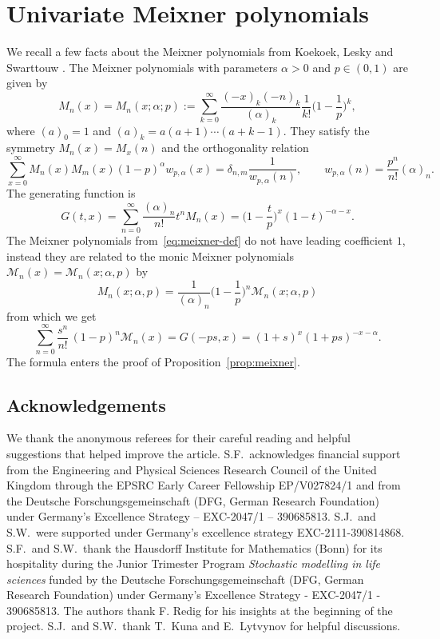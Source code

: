 \documentclass[10pt,a4paper]{amsart}
\numberwithin{equation}{section}
\newcommand{\1}{\mathbbm{1}}
\begin{document}
\section{Univariate Meixner polynomials} \label{app:meixner}
We recall a few facts about the Meixner polynomials from Koekoek, Lesky and Swarttouw \mbox{\cite[Section 9]{HypergeometricOrthogonalPolynomials}}. The Meixner polynomials with parameters $\alpha>0$ and $p\in (0,1)$ are given by
\begin{equation} \label{eq:meixner-def}
 M_n(x) = M_n(x; \alpha; p) := \sum_{k=0}^\infty \frac{(-x)_k (-n)_k}{(\alpha)_k} \frac{1}{k!} \biggl(1- \frac1p\biggr)^k,
\end{equation}
where $(a)_0 = 1$ and $(a)_k = a(a+1)\cdots (a+k-1)$.
They satisfy the symmetry $M_n(x) = M_x(n)$ and the orthogonality relation
\[
	\sum_{x=0}^\infty M_n(x) M_m(x) (1-p)^\alpha w_{p,\alpha}(x) = \delta_{n,m} \frac{1}{w_{p,\alpha}(n)},\qquad w_{p,\alpha}(n) = \frac{p^n}{n!} (\alpha)_n.
\] 	
The generating function is
\[
	G(t,x) = \sum_{n=0}^\infty \frac{(\alpha)_n}{n!} t^n M_n(x) = \biggl( 1- \frac t p \biggr)^x (1-t)^{-\alpha - x}.
\]
The Meixner polynomials from~\eqref{eq:meixner-def} do not have leading coefficient $1$, instead they are related to the monic Meixner polynomials $\mathcal M_n(x) = \mathcal M_n(x; \alpha, p)$ by
\begin{equation*} %
	M_n(x; \alpha, p) = \frac{1}{(\alpha)_n} \biggl( 1- \frac 1p\biggr)^n \mathcal M_n(x; \alpha, p)
\end{equation*}
from which we get
\begin{equation} \label{eq:pmonic-gf}
	\sum_{n=0}^\infty \frac{s^n}{n!}\,(1-p)^n \mathcal M_n(x) = G(-ps, x) = (1+s)^x (1+p s)^{-x-\alpha}.
\end{equation}
The formula enters the proof of Proposition~\ref{prop:meixner}.

\subsection*{Acknowledgements}

We thank the anonymous referees for their careful reading and helpful suggestions that helped improve the article.
S.F.\ acknowledges financial support from the Engineering and Physical Sciences Research Council of the United Kingdom through the EPSRC Early Career Fellowship EP/V027824/1 and from the Deutsche Forschungsgemeinschaft (DFG, German Research Foundation) under Germany’s Excellence Strategy – EXC-2047/1 – 390685813. S.J.\ and S.W.\ were supported under Germany's excellence strategy EXC-2111-390814868. S.F.\ and S.W.\ thank the Hausdorff Institute for Mathematics (Bonn) for its hospitality during the Junior Trimester Program \textit{Stochastic modelling in life sciences} funded by the Deutsche Forschungsgemeinschaft (DFG, German Research Foundation) under Germany’s Excellence Strategy - EXC-2047/1 - 390685813. The authors thank F. Redig for his insights at the beginning of the project. S.J.\ and S.W.\ thank T.~Kuna and E.~Lytvynov for helpful discussions.
\end{document}
